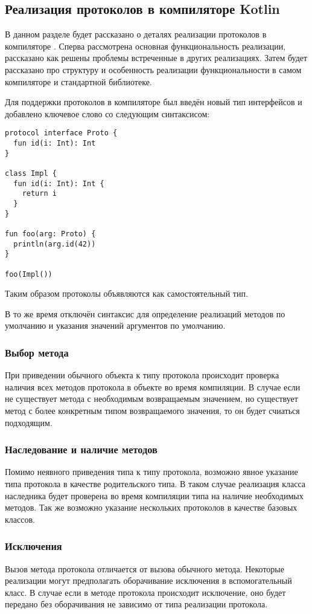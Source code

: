 \subsection{Реализация протоколов в компиляторе Kotlin}
В данном разделе будет рассказано о деталях реализации протоколов в компиляторе . Сперва рассмотрена основная функциональность реализации, рассказано как решены проблемы встреченные в других реализациях. Затем будет рассказано про структуру и особенность реализации функциональности в самом компиляторе и стандартной библиотеке.

Для поддержки протоколов в компиляторе был введён новый тип интерфейсов и добавлено ключевое слово  со следующим синтаксисом:

\begin{verbatim}
protocol interface Proto {
  fun id(i: Int): Int
}

class Impl {
  fun id(i: Int): Int {
    return i
  }
}

fun foo(arg: Proto) {
  println(arg.id(42))
}

foo(Impl())
\end{verbatim}

Таким образом протоколы объявляются как самостоятельный тип.

В то же время отключён синтаксис для определение реализаций методов по умолчанию и указания значений аргументов по умолчанию.

\subsubsection{Выбор метода}
При приведении обычного объекта к типу протокола происходит проверка наличия всех методов протокола в объекте во время компиляции. В случае если не существует метода с необходимым возвращаемым значением, но существует метод с более конкретным типом возвращаемого значения, то он будет счиаться подходящим.

\subsubsection{Наследование и наличие методов}
Помимо неявного приведения типа к типу протокола, возможно явное указание типа протокола в качестве родительского типа. В таком случае реализация класса наследника будет проверена во время компиляции типа на наличие необходимых методов. Так же возможно указание нескольких протоколов в качестве базовых классов.

\subsubsection{Исключения}
Вызов метода протокола отличается от вызова обычного метода. Некоторые реализации могут предполагать оборачивание исключения в вспомогательный класс. В случае если в методе протокола происходит исключение, оно будет передано без оборачивания не зависимо от типа реализации протокола.

